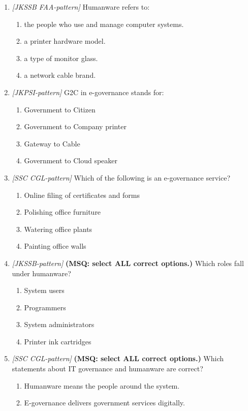 \begin{enumerate}[label=\textbf{Q\arabic*.}, leftmargin=*]
\item \textit{[JKSSB FAA-pattern]} Humanware refers to:
  \begin{enumerate}[label=\Alph*.]
    \item the people who use and manage computer systems.
    \item a printer hardware model.
    \item a type of monitor glass.
    \item a network cable brand.
  \end{enumerate}
\item \textit{[JKPSI-pattern]} G2C in e-governance stands for:
  \begin{enumerate}[label=\Alph*.]
    \item Government to Citizen
    \item Government to Company printer
    \item Gateway to Cable
    \item Government to Cloud speaker
  \end{enumerate}
\item \textit{[SSC CGL-pattern]} Which of the following is an e-governance service?
  \begin{enumerate}[label=\Alph*.]
    \item Online filing of certificates and forms
    \item Polishing office furniture
    \item Watering office plants
    \item Painting office walls
  \end{enumerate}
\item \textit{[JKSSB-pattern]} \textbf{(MSQ: select ALL correct options.)} Which roles fall under humanware?
  \begin{enumerate}[label=\Alph*.]
    \item System users
    \item Programmers
    \item System administrators
    \item Printer ink cartridges
  \end{enumerate}
\item \textit{[SSC CGL-pattern]} \textbf{(MSQ: select ALL correct options.)} Which statements about IT governance and humanware are correct?
  \begin{enumerate}[label=\Alph*.]
    \item Humanware means the people around the system.
    \item E-governance delivers government services digitally.

\end{enumerate}
\end{enumerate}
